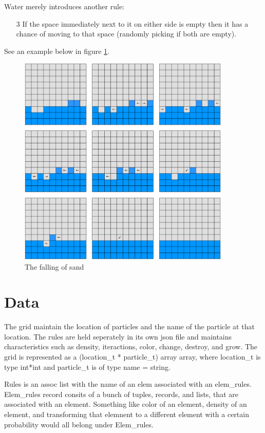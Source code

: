 Water merely introduces another rule:
\begin{enumerate}
  \item[3] If the space immediately next to it on either side is empty then it has a chance
    of moving to that space (randomly picking if both are empty).
\end{enumerate}
See an example below in figure \ref{fig:water}.

\begin{figure}[H]
  \caption{The falling of sand}
  \label{fig:water}
  \vspace{3em}
  \center\includegraphics[width=0.9\textwidth]{images/grid_water}
\end{figure}

\section{Data}
The grid maintain the location of particles and the name of the particle at that location. The rules are held seperately in its own json file and maintains characteristics such as density, iteractions, color, change, destroy, and grow. The grid is represented as a (location_t * particle_t) array array, where location_t is type int*int and particle_t is of type {name = string}. 

Rules is an assoc list with the name of an elem associated with an elem_rules. Elem_rules record consits of 
a bunch of tuples, records, and lists, that are associated with an element. Something like color of an element, 
density of an element, and transforming that elemnent to a different element with a certain probability would
all belong under Elem_rules.

